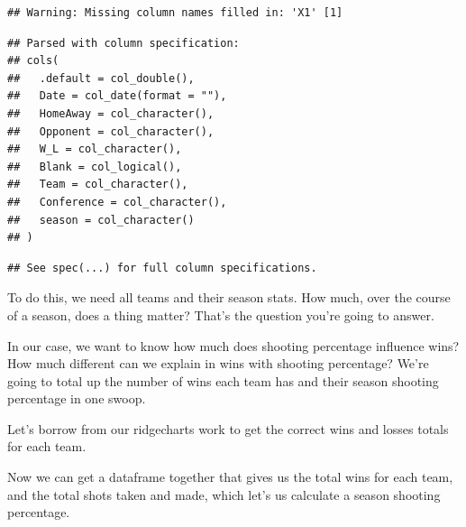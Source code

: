 \documentclass[]{book}
\newenvironment{Shaded}{\begin{snugshade}}{\end{snugshade}}
\newcommand{\KeywordTok}[1]{\textcolor[rgb]{0.13,0.29,0.53}{\textbf{#1}}}
\newcommand{\DataTypeTok}[1]{\textcolor[rgb]{0.13,0.29,0.53}{#1}}
\newcommand{\DecValTok}[1]{\textcolor[rgb]{0.00,0.00,0.81}{#1}}
\newcommand{\StringTok}[1]{\textcolor[rgb]{0.31,0.60,0.02}{#1}}
\newcommand{\OperatorTok}[1]{\textcolor[rgb]{0.81,0.36,0.00}{\textbf{#1}}}
\newcommand{\NormalTok}[1]{#1}
\begin{document}
\begin{verbatim}
## Warning: Missing column names filled in: 'X1' [1]
\end{verbatim}

\begin{verbatim}
## Parsed with column specification:
## cols(
##   .default = col_double(),
##   Date = col_date(format = ""),
##   HomeAway = col_character(),
##   Opponent = col_character(),
##   W_L = col_character(),
##   Blank = col_logical(),
##   Team = col_character(),
##   Conference = col_character(),
##   season = col_character()
## )
\end{verbatim}

\begin{verbatim}
## See spec(...) for full column specifications.
\end{verbatim}

To do this, we need all teams and their season stats. How much, over the
course of a season, does a thing matter? That's the question you're
going to answer.

In our case, we want to know how much does shooting percentage influence
wins? How much different can we explain in wins with shooting
percentage? We're going to total up the number of wins each team has and
their season shooting percentage in one swoop.

Let's borrow from our ridgecharts work to get the correct wins and
losses totals for each team.

\begin{Shaded}
\end{Shaded}

Now we can get a dataframe together that gives us the total wins for
each team, and the total shots taken and made, which let's us calculate
a season shooting percentage.

\begin{Shaded}
\end{Shaded}
\end{document}
